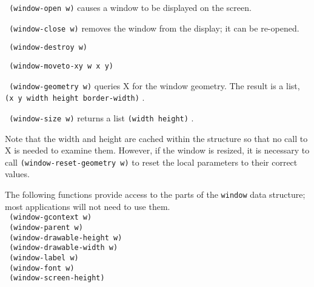 {\tt \hspace*{0.5in} (window-open w)} causes a window to be displayed
on the screen.

{\tt \hspace*{0.5in} (window-close w)} removes the window from the display;
it can be re-opened.

{\tt \hspace*{0.5in} (window-destroy w)}

{\tt \hspace*{0.5in} (window-moveto-xy w x y)}

{\tt \hspace*{0.5in} (window-geometry w)} queries X for the window geometry.
The result is a list, \linebreak
{\tt (x y width height border-width)} .

{\tt \hspace*{0.5in} (window-size w)} returns a list {\tt (width height)} .

\vspace{-0.1in}
Note that the width and height are cached within the structure so that no call
to X is needed to examine them.  However, if the window is resized, it is
necessary to call {\tt (window-reset-geometry\ w)} to reset the local
parameters to their correct values.

%
%

The following functions provide access to the parts of the {\tt window} data
structure; most applications will not need to use them. \\

\vspace{-0.1in}
{\tt \hspace*{0.5in} (window-gcontext        w)} \\
{\tt \hspace*{0.5in} (window-parent          w)} \\
{\tt \hspace*{0.5in} (window-drawable-height w)} \\
{\tt \hspace*{0.5in} (window-drawable-width  w)} \\
{\tt \hspace*{0.5in} (window-label           w)} \\
{\tt \hspace*{0.5in} (window-font            w)} \\
{\tt \hspace*{0.5in} (window-screen-height)} \\


